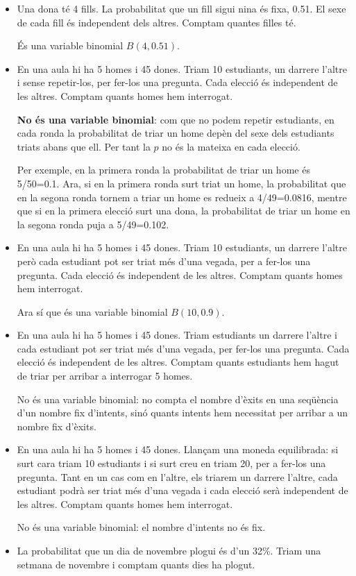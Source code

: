 \documentclass[
]{book}
\theoremstyle{definition}
\theoremstyle{definition}
\theoremstyle{definition}
\theoremstyle{remark}
\begin{document}
\begin{itemize}
\item
  Una dona té 4 fills. La probabilitat que un fill sigui nina és fixa, 0.51. El sexe de cada fill és independent dels altres. Comptam quantes filles té.

  És una variable binomial \(B(4,0.51)\).
\item
  En una aula hi ha 5 homes i 45 dones. Triam 10 estudiants, un darrere l'altre i sense repetir-los, per fer-los una pregunta. Cada elecció és independent de les altres. Comptam quants homes hem interrogat.

  \textbf{No és una variable binomial}: com que no podem repetir estudiants, en cada ronda la probabilitat de triar un home depèn del sexe dels estudiants triats abans que ell. Per tant la \(p\) no és la mateixa en cada elecció.

  Per exemple, en la primera ronda la probabilitat de triar un home és 5/50=0.1. Ara, si en la primera ronda surt triat un home, la probabilitat que en la segona ronda tornem a triar un home es redueix a 4/49=0.0816, mentre que si en la primera elecció surt una dona, la probabilitat de triar un home en la segona ronda puja a 5/49=0.102.
\item
  En una aula hi ha 5 homes i 45 dones. Triam 10 estudiants, un darrere l'altre però cada estudiant pot ser triat més d'una vegada, per a fer-los una pregunta. Cada elecció és independent de les altres. Comptam quants homes hem interrogat.

  Ara sí que és una variable binomial \(B(10,0.9)\).
\item
  En una aula hi ha 5 homes i 45 dones. Triam estudiants un darrere l'altre i cada estudiant pot ser triat més d'una vegada, per fer-los una pregunta. Cada elecció és independent de les altres. Comptam quants estudiants hem hagut de triar per arribar a interrogar 5 homes.

  No és una variable binomial: no compta el nombre d'èxits en una seqüència d'un nombre fix d'intents, sinó quants intents hem necessitat per arribar a un nombre fix d'èxits.
\item
  En una aula hi ha 5 homes i 45 dones. Llançam una moneda equilibrada: si surt cara triam 10 estudiants i si surt creu en triam 20, per a fer-los una pregunta. Tant en un cas com en l'altre, els triarem un darrere l'altre, cada estudiant podrà ser triat més d'una vegada i cada elecció serà independent de les altres. Comptam quants homes hem interrogat.

  No és una variable binomial: el nombre d'intents no és fix.
\item
  La probabilitat que un dia de novembre plogui és d'un 32\%. Triam una setmana de novembre i comptam quants dies ha plogut.


\end{itemize}
\end{document}
